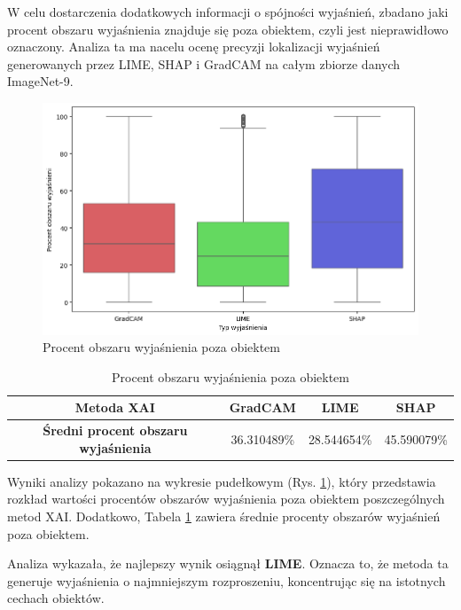 \vspace{1cm}

W celu dostarczenia dodatkowych informacji o spójności wyjaśnień, zbadano jaki procent obszaru wyjaśnienia znajduje się poza obiektem, czyli jest nieprawidłowo oznaczony.
Analiza ta ma nacelu ocenę precyzji lokalizacji wyjaśnień generowanych przez LIME, SHAP i GradCAM na całym zbiorze danych ImageNet-9.

\begin{figure}[h]
	\centering\includegraphics[width=.9\textwidth]{img/areaincorrect}
	\caption{Procent obszaru wyjaśnienia poza obiektem}  \label{rys:areaincorrect}
\end{figure}

\begin{table}[h]
	\centering
	\begin{tabular}{|c|c|c|c|}
		\hline
		\textbf{Metoda XAI}                          & \textbf{GradCAM} & \textbf{LIME} & \textbf{SHAP} \\
		\hline
		\textbf{Średni procent obszaru wyjaśnienia } & 36.310489\%      & 28.544654\%   & 45.590079\%   \\
		\hline
	\end{tabular}
	\caption{Procent obszaru wyjaśnienia poza obiektem}
	\label{tab:areaincorrect}
\end{table}

Wyniki analizy pokazano na wykresie pudełkowym (Rys. \ref{rys:areaincorrect}), który przedstawia rozkład wartości procentów obszarów wyjaśnienia poza obiektem poszczególnych metod XAI.
Dodatkowo, Tabela \ref{tab:areaincorrect} zawiera średnie procenty obszarów wyjaśnień poza obiektem.

Analiza wykazała, że najlepszy wynik osiągnął \textbf{LIME}.
Oznacza to, że metoda ta generuje wyjaśnienia o najmniejszym rozproszeniu, koncentrując się na istotnych cechach obiektów.

